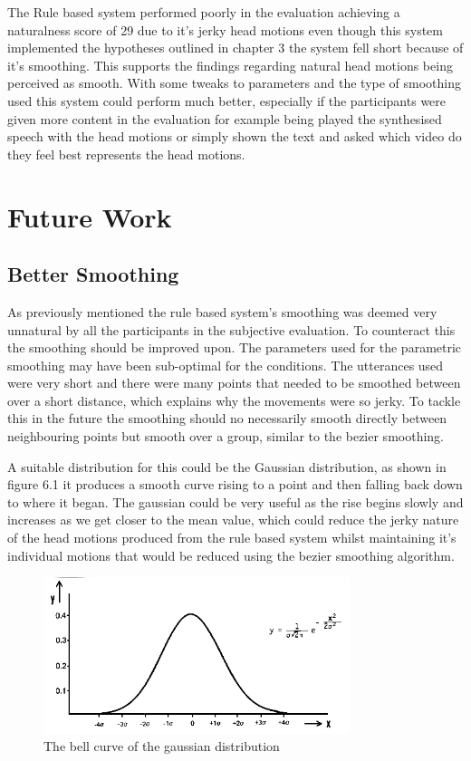 \documentclass[bsc,frontabs,twoside,singlespacing,parskip,deptreport]{infthesis}
\begin{document}
The Rule based system performed poorly in the evaluation achieving a naturalness score of 29 due to it's jerky head motions even though this system implemented the hypotheses outlined in chapter 3 the system fell short because of it's smoothing. This supports the findings regarding natural head motions being perceived as smooth. With some tweaks to parameters and the type of smoothing used this system could perform much better, especially if the participants were given more content in the evaluation for example being played the synthesised speech with the head motions or simply shown the text and asked which video do they feel best represents the head motions.

\section{Future Work}

\subsection{Better Smoothing}

As previously mentioned the rule based system's smoothing was deemed very unnatural by all the participants in the subjective evaluation. To counteract this the smoothing should be improved upon. The parameters used for the parametric smoothing may have been sub-optimal for the conditions. The utterances used were very short and there were many points that needed to be smoothed between over a short distance, which explains why the movements were so jerky. To tackle this in the future the smoothing should no necessarily smooth directly between neighbouring points but smooth over a group, similar to the bezier smoothing. 

A suitable distribution for this could be the Gaussian distribution, as shown in figure 6.1 it produces a smooth curve rising to a point and then falling back down to where it began. The gaussian could be very useful as the rise begins slowly and increases as we get closer to the mean value, which could reduce the jerky nature of the head motions produced from the rule based system whilst maintaining it's individual motions that would be reduced using the bezier smoothing algorithm.

\begin{figure}
	\centering
	\includegraphics[width=0.8\textwidth]{gaussian.png}
	\caption{The bell curve of the gaussian distribution}
\end{figure}
\end{document}
